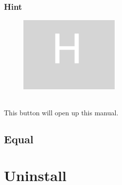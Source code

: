 \documentclass[11pt, a4paper]{article}
\theoremstyle{definition}
\begin{document}
    \subsubsection[scale = 0.2]{Hint}


    \begin{figure}[h]
        \includegraphics[scale = 0.2]{hint}
        \centering
        \label{fig:h}
    \end{figure}
    \\
    This button will open up this manual.

    \newpage

    \subsection{Equal}


    \section{Uninstall}
\end{document}
